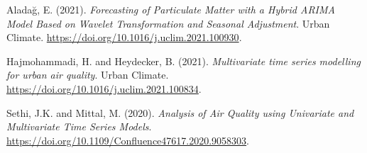 \documentclass[fleqn,10pt]{SelfArx} %
\begin{document}














\begin{thebibliography}{9}

Aladağ, E. (2021). \textit{Forecasting of Particulate Matter with a Hybrid ARIMA Model Based on Wavelet Transformation and Seasonal Adjustment}. Urban Climate. \url{https://doi.org/10.1016/j.uclim.2021.100930}.

Hajmohammadi, H. and Heydecker, B. (2021). \textit{Multivariate time series modelling for urban air quality}. Urban Climate. \url{https://doi.org/10.1016/j.uclim.2021.100834}.

Sethi, J.K. and Mittal, M. (2020). \textit{Analysis of Air Quality using Univariate and Multivariate Time Series Models}. \url{https://doi.org/10.1109/Confluence47617.2020.9058303}.

\end{thebibliography}

\end{document}

